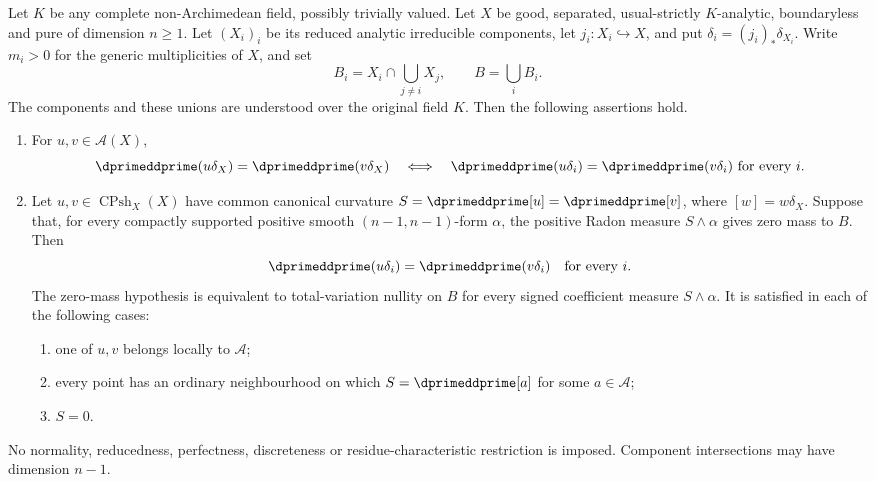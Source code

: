\begin{proposition}
\label{prop:ch14-component-curvature}
Let $K$ be any complete non-Archimedean field, possibly trivially valued.
Let $X$ be good, separated, usual-strictly $K$-analytic, boundaryless and
pure of dimension $n\geq1$.  Let $(X_i)_i$ be its reduced analytic
irreducible components, let $j_i:X_i\hookrightarrow X$, and put
$\delta_i=(j_i)_*\delta_{X_i}$.  Write $m_i>0$ for the generic
multiplicities of $X$, and set
\[
 B_i=X_i\cap\bigcup_{j\ne i}X_j,
 \qquad B=\bigcup_iB_i.
\]
The components and these unions are understood over the original field
$K$.  Then the following assertions hold.
\begin{enumerate}
\item\label{itm:ch14-component-curvature:approachable}
For $u,v\in\mathscr A(X)$,
\begin{equation}
 \dprimeddprime(u\delta_X)=\dprimeddprime(v\delta_X)
 \quad\Longleftrightarrow\quad
 \dprimeddprime(u\delta_i)=\dprimeddprime(v\delta_i)
 \ \text{for every }i .
 \label{eq:ch14-component-curvature-equivalence}
\end{equation}
\item\label{itm:ch14-component-curvature:common}
Let $u,v\in\operatorname{CPsh}_X(X)$ have common canonical curvature
$S=\dprimeddprime[u]=\dprimeddprime[v]$, where $[w]=w\delta_X$.
Suppose that, for every compactly supported positive smooth
$(n-1,n-1)$-form $\alpha$, the positive Radon measure $S\wedge\alpha$
gives zero mass to $B$.  Then
\begin{equation}
                 \dprimeddprime(u\delta_i)
                    =\dprimeddprime(v\delta_i)
                    \quad\text{for every }i .
 \label{eq:ch14-component-common-curvature}
\end{equation}
The zero-mass hypothesis is equivalent to total-variation nullity on $B$
for every signed coefficient measure $S\wedge\alpha$.  It is satisfied
in each of the following cases:
\begin{enumerate}
\item\label{itm:ch14-component-curvature:one-side}
one of $u,v$ belongs locally to $\mathscr A$;
\item\label{itm:ch14-component-curvature:local-potential}
every point has an ordinary neighbourhood on which $S=\dprimeddprime[a]$
for some $a\in\mathscr A$;
\item\label{itm:ch14-component-curvature:zero}
$S=0$.
\end{enumerate}
\end{enumerate}
No normality, reducedness, perfectness, discreteness or
residue-characteristic restriction is imposed.  Component intersections
may have dimension $n-1$.
\end{proposition}

